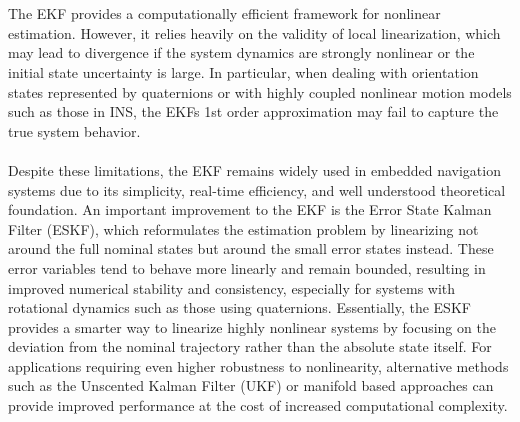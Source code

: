 \\ \\
The EKF provides a computationally efficient framework for nonlinear estimation. However, it relies heavily on the validity of local linearization, which may lead to divergence if the system dynamics are strongly nonlinear or the initial state uncertainty is large. In particular, when dealing with orientation states represented by quaternions or with highly coupled nonlinear motion models such as those in INS, the EKFs 1st order approximation may fail to capture the true system behavior.  
\\ \\
Despite these limitations, the EKF remains widely used in embedded navigation systems due to its simplicity, real-time efficiency, and well understood theoretical foundation. An important improvement to the EKF is the Error State Kalman Filter (ESKF), which reformulates the estimation problem by linearizing not around the full nominal states but around the small error states instead. These error variables tend to behave more linearly and remain bounded, resulting in improved numerical stability and consistency, especially for systems with rotational dynamics such as those using quaternions. Essentially, the ESKF provides a smarter way to linearize highly nonlinear systems by focusing on the deviation from the nominal trajectory rather than the absolute state itself. For applications requiring even higher robustness to nonlinearity, alternative methods such as the Unscented Kalman Filter (UKF) or manifold based approaches can provide improved performance at the cost of increased computational complexity.

